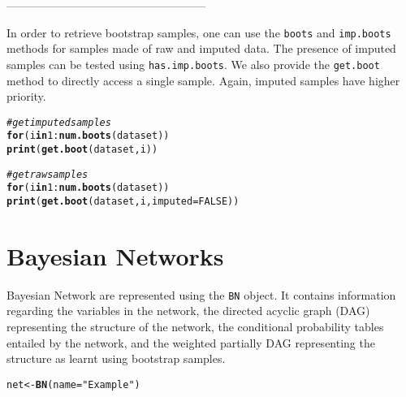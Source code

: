 \documentclass{article}\usepackage[]{graphicx}\usepackage[]{color}
\makeatletter
\newcommand{\hlnum}[1]{\textcolor[rgb]{0.686,0.059,0.569}{#1}}%
\newcommand{\hlstr}[1]{\textcolor[rgb]{0.192,0.494,0.8}{#1}}%
\newcommand{\hlcom}[1]{\textcolor[rgb]{0.678,0.584,0.686}{\textit{#1}}}%
\newcommand{\hlopt}[1]{\textcolor[rgb]{0,0,0}{#1}}%
\newcommand{\hlstd}[1]{\textcolor[rgb]{0.345,0.345,0.345}{#1}}%
\newcommand{\hlkwa}[1]{\textcolor[rgb]{0.161,0.373,0.58}{\textbf{#1}}}%
\newcommand{\hlkwb}[1]{\textcolor[rgb]{0.69,0.353,0.396}{#1}}%
\newcommand{\hlkwc}[1]{\textcolor[rgb]{0.333,0.667,0.333}{#1}}%
\newcommand{\hlkwd}[1]{\textcolor[rgb]{0.737,0.353,0.396}{\textbf{#1}}}%
\newenvironment{kframe}{%
 \def\at@end@of@kframe{}%
 \ifinner\ifhmode%
  \def\at@end@of@kframe{\end{minipage}}%
  \begin{minipage}{\columnwidth}%
 \fi\fi%
 \def\FrameCommand##1{\hskip\@totalleftmargin \hskip-\fboxsep
 \colorbox{shadecolor}{##1}\hskip-\fboxsep
     \hskip-\linewidth \hskip-\@totalleftmargin \hskip\columnwidth}%
 \MakeFramed {\advance\hsize-\width
   \@totalleftmargin\z@ \linewidth\hsize
   \@setminipage}}%
 {\par\unskip\endMakeFramed%
 \at@end@of@kframe}
\newenvironment{knitrout}{}{} %
\newcommand{\Robject}[1]{{\texttt{#1}}}
\newcommand{\Rmethod}[1]{{\texttt{#1}}}
\makeatother
\begin{document}
-----------------------------------------------------

In order to retrieve bootstrap samples, one can use the \Rmethod{boots} and \Rmethod{imp.boots} methods for samples
made of raw and imputed data. The presence of imputed samples can be tested using \Rmethod{has.imp.boots}.
We also provide the \Rmethod{get.boot} method to directly access a single sample. Again, imputed samples have higher priority.
\begin{knitrout}
\color{fgcolor}\begin{kframe}
\begin{alltt}
\hlcom{# get imputed samples}
\hlkwa{for} \hlstd{(i} \hlkwa{in} \hlnum{1}\hlopt{:}\hlkwd{num.boots}\hlstd{(dataset))}
  \hlkwd{print}\hlstd{(} \hlkwd{get.boot}\hlstd{(dataset, i) )}
\end{alltt}
\end{kframe}
\end{knitrout}

\begin{knitrout}
\color{fgcolor}\begin{kframe}
\begin{alltt}
\hlcom{# get raw samples}
\hlkwa{for} \hlstd{(i} \hlkwa{in} \hlnum{1}\hlopt{:}\hlkwd{num.boots}\hlstd{(dataset))}
  \hlkwd{print}\hlstd{(} \hlkwd{get.boot}\hlstd{(dataset, i,} \hlkwc{imputed} \hlstd{=} \hlnum{FALSE}\hlstd{) )}
\end{alltt}
\end{kframe}
\end{knitrout}


\section{Bayesian Networks}
Bayesian Network are represented using the \Robject{BN} object. It contains information regarding the variables in the network,
the directed acyclic graph (DAG) representing the structure of the network, the conditional probability tables entailed by 
the network, and the weighted partially DAG representing the structure as learnt using bootstrap samples.

\begin{knitrout}
\color{fgcolor}\begin{kframe}
\begin{alltt}
\hlstd{net} \hlkwb{<-} \hlkwd{BN}\hlstd{(}\hlkwc{name} \hlstd{=} \hlstr{"Example"}\hlstd{)}
\end{alltt}
\end{kframe}
\end{knitrout}
\end{document}
